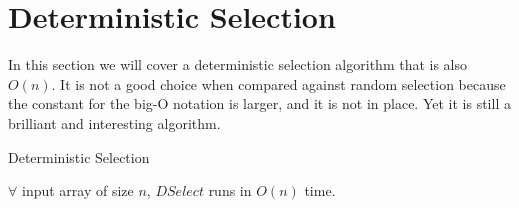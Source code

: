 \section{Deterministic Selection}
In this section we will cover a deterministic selection algorithm that is also $O(n)$. It is not a good choice when compared against random selection because the constant for the big-O notation is larger, and it is not in place. Yet it is still a brilliant and interesting algorithm.
\begin{algorithm}[ht]
\caption{Deterministic Selection}\label{dselection}
\begin{algorithmic}[1]
\Input{}
\Output{}
\Else{}
\EndIf
\EndFunction
\end{algorithmic}
\end{algorithm}
\begin{theorem}
$\forall$ input array of size $n$, $DSelect$ runs in $O(n)$ time.
\end{theorem}
\ifx\PREAMBLE\undefined

\fi